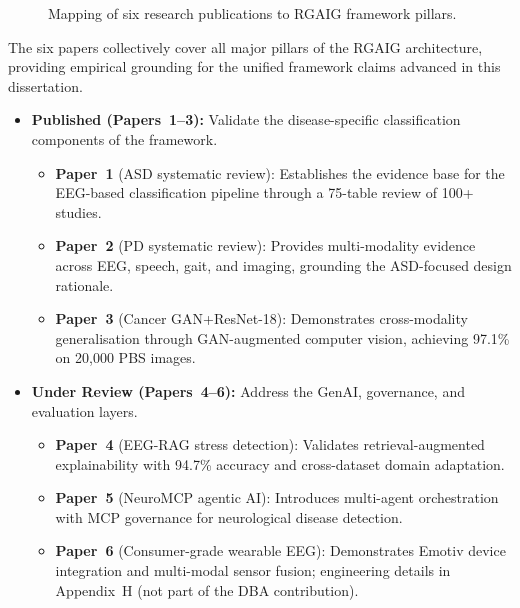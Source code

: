 \begin{figure}[!htbp]
{%
}
\caption{Mapping of six research publications to RGAIG framework pillars.}
\label{fig:ch1_papers_framework_mapping}
\end{figure}
\fi %

The six papers collectively cover all major pillars of the RGAIG architecture, providing empirical grounding for the unified framework claims advanced in this dissertation.

\begin{itemize}[leftmargin=*, itemsep=3pt]
  \item \textbf{Published (Papers~1--3):} Validate the disease-specific classification components of the framework.
  \begin{itemize}[leftmargin=*, itemsep=2pt]
    \item \textbf{Paper~1} (ASD systematic review): Establishes the evidence base for the EEG-based classification pipeline through a 75-table review of 100+ studies.
    \item \textbf{Paper~2} (PD systematic review): Provides multi-modality evidence across EEG, speech, gait, and imaging, grounding the ASD-focused design rationale.
    \item \textbf{Paper~3} (Cancer GAN+ResNet-18): Demonstrates cross-modality generalisation through GAN-augmented computer vision, achieving 97.1\% on 20,000 PBS images.
  \end{itemize}
  \item \textbf{Under Review (Papers~4--6):} Address the GenAI, governance, and evaluation layers.
  \begin{itemize}[leftmargin=*, itemsep=2pt]
    \item \textbf{Paper~4} (EEG-RAG stress detection): Validates retrieval-augmented explainability with 94.7\% accuracy and cross-dataset domain adaptation.
    \item \textbf{Paper~5} (NeuroMCP agentic AI): Introduces multi-agent orchestration with MCP governance for neurological disease detection.
    \item \textbf{Paper~6} (Consumer-grade wearable EEG): Demonstrates Emotiv device integration and multi-modal sensor fusion; engineering details in Appendix~H (not part of the DBA contribution).
  \end{itemize}
\end{itemize}
\fi


